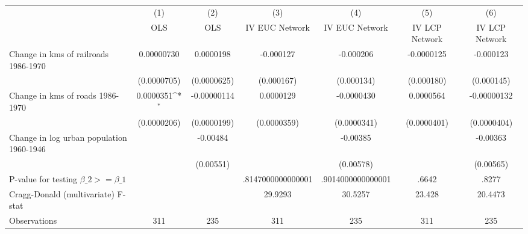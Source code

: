 {
\def\sym#1{\ifmmode^{#1}\else\(^{#1}\)\fi}
\begin{tabular}{l*{6}{c}}
\hline\hline
                &\multicolumn{1}{c}{(1)}&\multicolumn{1}{c}{(2)}&\multicolumn{1}{c}{(3)}&\multicolumn{1}{c}{(4)}&\multicolumn{1}{c}{(5)}&\multicolumn{1}{c}{(6)}\\
                &\multicolumn{1}{c}{OLS}&\multicolumn{1}{c}{OLS}&\multicolumn{1}{c}{IV EUC Network}&\multicolumn{1}{c}{IV EUC Network}&\multicolumn{1}{c}{IV LCP Network}&\multicolumn{1}{c}{IV LCP Network}\\
\hline
Change in kms of railroads 1986-1970&0.00000730         &0.0000198         &-0.000127         &-0.000206         &-0.0000125         &-0.000123         \\
                &(0.0000705)         &(0.0000625)         &(0.000167)         &(0.000134)         &(0.000180)         &(0.000145)         \\
[1em]
Change in kms of roads 1986-1970&0.0000351\sym{*}  &-0.00000114         &0.0000129         &-0.0000430         &0.0000564         &-0.00000132         \\
                &(0.0000206)         &(0.0000199)         &(0.0000359)         &(0.0000341)         &(0.0000401)         &(0.0000404)         \\
[1em]
Change in log urban population 1960-1946&                  & -0.00484         &                  & -0.00385         &                  & -0.00363         \\
                &                  &(0.00551)         &                  &(0.00578)         &                  &(0.00565)         \\
\hline
P-value for testing $\beta\_{2} >= \beta\_{1}$&                  &                  &.8147000000000001         &.9014000000000001         &    .6642         &    .8277         \\
Cragg-Donald (multivariate) F-stat&                  &                  &  29.9293         &  30.5257         &   23.428         &  20.4473         \\
Observations    &      311         &      235         &      311         &      235         &      311         &      235         \\
\hline\hline
\end{tabular}
}
